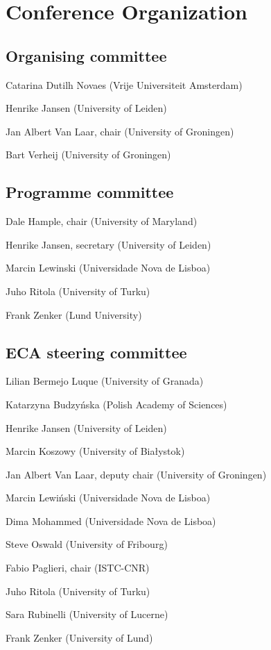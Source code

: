 \newpage

\section*{Conference Organization}
	\subsection*{Organising committee}
	\begin{compactitem}[]
		\item[] Catarina Dutilh Novaes (Vrije Universiteit Amsterdam)
		\item[] Henrike Jansen (University of Leiden)
		\item[] Jan Albert Van Laar, chair (University of Groningen)
		\item[] Bart Verheij (University of Groningen)
	\end{compactitem}

	\subsection*{Programme committee}
	\begin{compactitem}[]
		\item[] Dale Hample, chair (University of Maryland)
		\item[] Henrike Jansen, secretary (University of Leiden)
		\item[] Marcin Lewinski (Universidade Nova de Lisboa)
		\item[] Juho Ritola (University of Turku)
		\item[] Frank Zenker (Lund University)
 	\end{compactitem}

 	\subsection*{ECA steering committee}
 	\begin{compactitem}[]
		\item[] Lilian Bermejo Luque (University of Granada)
		\item[] Katarzyna Budzyńska (Polish Academy of Sciences)
		\item[] Henrike Jansen (University of Leiden)
		\item[] Marcin Koszowy (University of Białystok)
		\item[] Jan Albert Van Laar, deputy chair (University of Groningen)
		\item[] Marcin Lewiński (Universidade Nova de Lisboa)
		\item[] Dima Mohammed (Universidade Nova de Lisboa)
		\item[] Steve Oswald (University of Fribourg)
		\item[] Fabio Paglieri, chair (ISTC-CNR)
		\item[] Juho Ritola (University of Turku)
		\item[] Sara Rubinelli (University of Lucerne)
		\item[] Frank Zenker (University of Lund)
	\end{compactitem}


